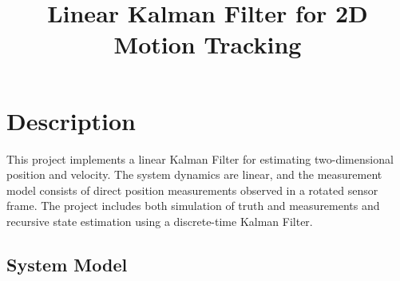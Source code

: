 \documentclass[11pt, letterpaper, twocolumn]{article}
\title{Linear Kalman Filter for 2D Motion Tracking}
\author{}
\date{}
\begin{document}
\maketitle

\section*{Description}

This project implements a linear Kalman Filter for estimating two-dimensional
position and velocity. The system dynamics are linear, and the measurement model
consists of direct position measurements observed in a rotated sensor frame.
The project includes both simulation of truth and measurements and recursive 
state estimation using a discrete-time Kalman Filter.

\subsection*{System Model}
\end{document}
